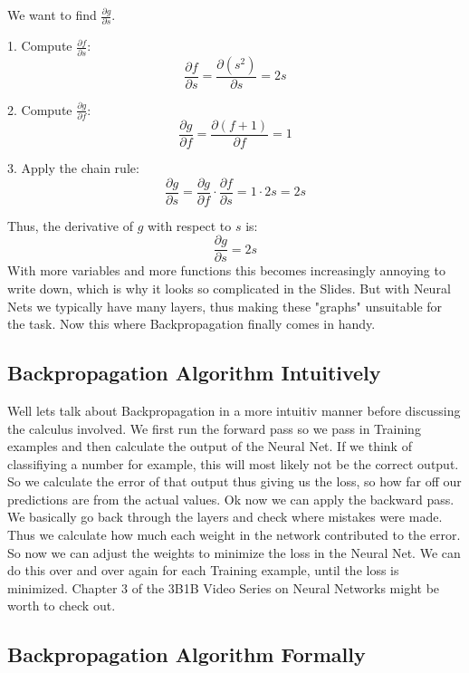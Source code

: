 \documentclass[a4paper]{article}
\begin{document}
We want to find \(\frac{\partial g}{\partial s}\).


1. Compute \(\frac{\partial f}{\partial s}\):
\[
\frac{\partial f}{\partial s} = \frac{\partial (s^2)}{\partial s} = 2s
\]

2. Compute \(\frac{\partial g}{\partial f}\):
\[
\frac{\partial g}{\partial f} = \frac{\partial (f + 1)}{\partial f} = 1
\]

3. Apply the chain rule:
\[
\frac{\partial g}{\partial s} = \frac{\partial g}{\partial f} \cdot \frac{\partial f}{\partial s} = 1 \cdot 2s = 2s
\]

Thus, the derivative of \(g\) with respect to \(s\) is:
\[
\frac{\partial g}{\partial s} = 2s
\]
With more variables and more functions this becomes increasingly annoying to write down, which is why it looks so complicated in the Slides. But with Neural Nets we typically have many layers, thus making these "graphs" unsuitable for the task.
Now this where Backpropagation finally comes in handy.
\subsection{Backpropagation Algorithm Intuitively}
Well lets talk about Backpropagation in a more intuitiv manner before discussing the calculus involved. We first run the forward pass so we pass in Training examples and then calculate the output of the Neural Net. If we think of classifiying a number for example, this will most likely not be the correct output. So we calculate the error of that output thus giving us the loss, so how far off our predictions are from the actual values.
Ok now we can apply the backward pass. We basically go back through the layers and check where mistakes were made. Thus we calculate how much each weight in the network contributed to the error. So now we can adjust the weights to minimize the loss in the Neural Net. We can do this over and over again for each Training example, until the loss is minimized. Chapter 3 of the 3B1B Video Series on Neural Networks might be worth to check out. 


\subsection{Backpropagation Algorithm Formally}
\end{document}
